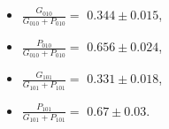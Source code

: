 \begin{itemize}
  \item $\frac{G_{010}}{G_{010} + P_{010}} =$ $0.344 \pm 0.015$,
  \item $\frac{P_{010}}{G_{010} + P_{010}} =$ $0.656 \pm 0.024$,
  \item $\frac{G_{101}}{G_{101} + P_{101}} =$ $0.331 \pm 0.018$,
  \item $\frac{P_{101}}{G_{101} + P_{101}} =$ $0.67 \pm 0.03$.
\end{itemize}
